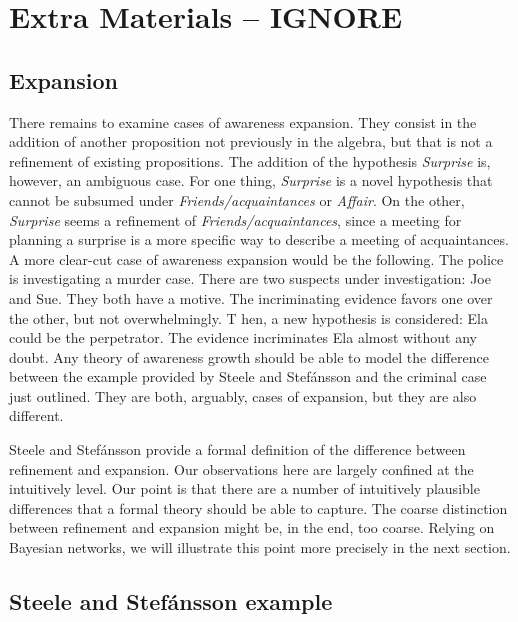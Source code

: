\documentclass[
  11pt,
  dvipsnames,enabledeprecatedfontcommands]{scrartcl}
\begin{document}
\hypertarget{extra-materials-ignore}{%
\section{Extra Materials -- IGNORE}\label{extra-materials-ignore}}

\hypertarget{expansion}{%
\subsection{Expansion}\label{expansion}}

There remains to examine cases of awareness expansion. They consist in
the addition of another proposition not previously in the algebra, but
that is not a refinement of existing propositions. The addition of the
hypothesis \textit{Surprise} is, however, an ambiguous case. For one
thing, \textit{Surprise} is a novel hypothesis that cannot be subsumed
under \textit{Friends/acquaintances} or \textit{Affair}. On the other,
\textit{Surprise} seems a refinement of \textit{Friends/acquaintances},
since a meeting for planning a surprise is a more specific way to
describe a meeting of acquaintances. A more clear-cut case of awareness
expansion would be the following. The police is investigating a murder
case. There are two suspects under investigation: Joe and Sue. They both
have a motive. The incriminating evidence favors one over the other, but
not overwhelmingly. T hen, a new hypothesis is considered: Ela could be
the perpetrator. The evidence incriminates Ela almost without any doubt.
Any theory of awareness growth should be able to model the difference
between the example provided by Steele and Stefánsson and the criminal
case just outlined. They are both, arguably, cases of expansion, but
they are also different.

Steele and Stefánsson provide a formal definition of the difference
between refinement and expansion. Our observations here are largely
confined at the intuitively level. Our point is that there are a number
of intuitively plausible differences that a formal theory should be able
to capture. The coarse distinction between refinement and expansion
might be, in the end, too coarse. Relying on Bayesian networks, we will
illustrate this point more precisely in the next section.

\hypertarget{steele-and-stefuxe1nsson-example}{%
\subsection{Steele and Stefánsson
example}\label{steele-and-stefuxe1nsson-example}}
\end{document}
